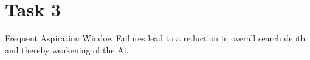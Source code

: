 \documentclass[a4paper,12pt]{article}
\begin{document}
\newpage

\section{Task 3}
Frequent Aspiration Window Failures lead to a reduction in overall search depth and thereby weakening of the Ai. 


\end{document}

